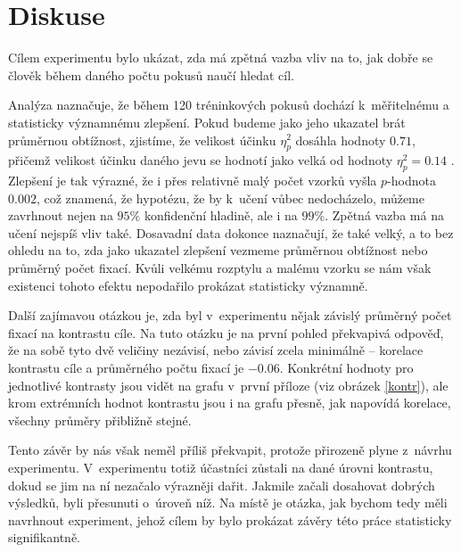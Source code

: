 \chapter{Diskuse}

Cílem experimentu bylo ukázat, zda má zpětná vazba vliv na to, jak dobře se
člověk během daného počtu pokusů naučí hledat cíl.

Analýza naznačuje, že během 120 tréninkových pokusů dochází k~měřitelnému a
statisticky významnému zlepšení. Pokud budeme jako jeho ukazatel brát průměrnou
obtížnost, zjistíme, že velikost účinku $\eta^2_p$ dosáhla hodnoty $0.71$,
přičemž velikost účinku daného jevu se hodnotí jako velká od hodnoty $\eta^2_p=0.14$
\citep{Cohen}. Zlepšení je tak výrazné, že i přes relativně malý počet vzorků
vyšla $p$-hodnota $0.002$, což znamená, že hypotézu, že by k~učení vůbec
nedocházelo, můžeme zavrhnout nejen na $95\%$ konfidenční hladině, ale i na
$99\%$. Zpětná vazba má na učení nejspíš vliv také. Dosavadní data dokonce
naznačují, že také velký, a to bez ohledu na to, zda jako ukazatel zlepšení
vezmeme průměrnou obtížnost nebo průměrný počet fixací. Kvůli velkému rozptylu
a malému vzorku se nám však existenci tohoto efektu nepodařilo prokázat
statisticky významně.

Další zajímavou otázkou je, zda byl v~experimentu nějak závislý průměrný počet
fixací na kontrastu cíle. Na tuto otázku je na první pohled překvapivá odpověď,
že na sobě tyto dvě veličiny nezávisí, nebo závisí zcela minimálně --
korelace kontrastu cíle a průměrného počtu fixací je $-0.06$. Konkrétní hodnoty pro jednotlivé kontrasty
jsou vidět na grafu v~první příloze (viz obrázek \ref{kontr}), ale krom
extrémních hodnot kontrastu jsou i na grafu přesně, jak napovídá korelace,
všechny průměry přibližně stejné.

Tento závěr by nás však neměl příliš překvapit, protože přirozeně plyne z~návrhu
experimentu. V~experimentu totiž účastníci zůstali na dané úrovni kontrastu,
dokud se jim na ní nezačalo výrazněji dařit. Jakmile začali dosahovat dobrých
výsledků, byli přesunuti o~úroveň níž. Na místě je otázka, jak bychom tedy měli
navrhnout experiment, jehož cílem by bylo prokázat závěry této práce
statisticky signifikantně.

